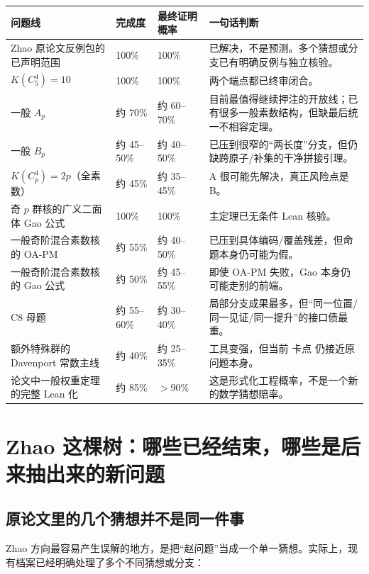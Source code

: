 \documentclass[11pt,a4paper]{ctexart}
\begin{document}
\begin{longtable}{p{}p{}p{}p{}}
\toprule
问题线 & 完成度 & 最终证明概率 & 一句话判断\\
\midrule
\endhead
Zhao 原论文反例包的已声明范围 & 100\% & 100\% & 已解决，不是预测。多个猜想或分支已有明确反例与独立核验。\\
$K(C_5^4)=10$ & 100\% & 100\% & 两个端点都已终审闭合。\\
一般 $A_p$ & 约 70\% & 约 60--70\% & 目前最值得继续押注的开放线；已有很多一般素数结构，但缺最后统一不相容定理。\\
一般 $B_p$ & 约 45--50\% & 约 40--50\% & 已压到很窄的“两长度”分支，但仍缺跨原子/补集的干净拼接引理。\\
$K(C_p^4)=2p$（全素数） & 约 45\% & 约 35--45\% & A 很可能先解决，真正风险点是 B。\\
奇 $p$ 群核的广义二面体 Gao 公式 & 100\% & 100\% & 主定理已无条件 Lean 核验。\\
一般奇阶混合素数核的 OA-PM & 约 55\% & 约 40--50\% & 已压到具体编码/覆盖残差，但命题本身仍可能为假。\\
一般奇阶混合素数核的 Gao 公式 & 约 50\% & 约 45--55\% & 即使 OA-PM 失败，Gao 本身仍可能走别的前端。\\
C8 母题 & 约 55--60\% & 约 30--40\% & 局部分支成果最多，但“同一位置/同一见证/同一提升”的接口债最重。\\
额外特殊群的 Davenport 常数主线 & 约 40\% & 约 25--35\% & 工具变强，但当前 卡点 仍接近原问题本身。\\
论文中一般权重定理的完整 Lean 化 & 约 85\% & $>90\%$ & 这是形式化工程概率，不是一个新的数学猜想赔率。\\
\bottomrule
\end{longtable}

\section{Zhao 这棵树：哪些已经结束，哪些是后来抽出来的新问题}

\subsection{原论文里的几个猜想并不是同一件事}

Zhao 方向最容易产生误解的地方，是把“赵问题”当成一个单一猜想。实际上，现有档案已经明确处理了多个不同猜想或分支：
\end{document}
